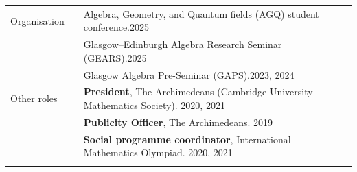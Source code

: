\documentclass[10pt]{article}
\newcommand{\nextItem}{\\[0.25em]}
\newcommand{\nextSection}{\\[0.5em]}
\begin{document}
\begin{longtable}{>{\raggedleft\arraybackslash}p{0.82in}>{}p{0.05in}>{}p{5.5in}}
    Organisation
     &  & Algebra, Geometry, and Quantum fields (AGQ) student conference.\hfill 2025\nextItem
     &  & Glasgow--Edinburgh Algebra Research Seminar (GEARS).\hfill 2025\nextItem         %
     &  & Glasgow Algebra Pre-Seminar (GAPS).\hfill 2023, 2024\nextSection                 %
    Other roles
     &  & \textbf{President}, The Archimedeans (Cambridge University
    Mathematics Society). \hfill 2020, 2021\nextItem%
     &  & \textbf{Publicity Officer}, The Archimedeans. \hfill 2019\nextItem%

     &  & \textbf{Social programme coordinator}, International Mathematics
    Olympiad. \hfill 2020, 2021                                                            \\\\[1em]%

\end{longtable}
\end{document}
